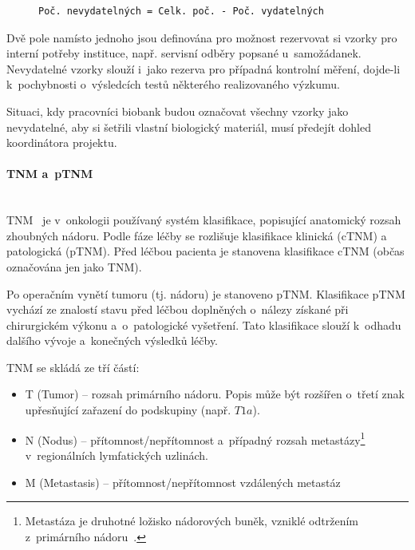 \documentclass[11pt, final, oneside]{fithesis2}
\newcommand{\paragraphNewLine}[1]{\paragraph*{#1}\mbox{}\\}
\begin{document}
\begin{figure}[ht!] %
\centering
\begin{BVerbatim}
Poč. nevydatelných = Celk. poč. - Poč. vydatelných
\end{BVerbatim}
\end{figure}
Dvě pole namísto jednoho jsou definována pro možnost rezervovat si vzorky pro interní potřeby instituce, např. servisní odběry popsané u~samožádanek. Nevydatelné vzorky slouží i~jako rezerva pro případná kontrolní měření, dojde-li k~pochybnosti o~výsledcích testů některého realizovaného výzkumu.

Situaci, kdy pracovníci biobank budou označovat všechny vzorky jako nevydatelné, aby si šetřili vlastní biologický materiál, musí předejít dohled koordinátora projektu. 

\paragraphNewLine{TNM a~pTNM}
TNM~\cite{TNM} je v~onkologii používaný systém klasifikace, popisující anatomický rozsah zhoubných nádoru. Podle fáze léčby se rozlišuje klasifikace klinická (cTNM) a patologická (pTNM). Před léčbou pacienta je stanovena klasifikace cTNM (občas označována jen jako TNM).

Po operačním vynětí tumoru (tj. nádoru) je stanoveno pTNM. Klasifikace pTNM vychází ze znalostí stavu před léčbou doplněných o~nálezy získané při chirurgickém výkonu a~o~patologické vyšetření. Tato klasifikace slouží k~odhadu dalšího vývoje a~konečných výsledků léčby. 

TNM se skládá ze tří částí:
\begin{itemize}
	\item T (Tumor) -- rozsah primárního nádoru. Popis může být rozšířen o~třetí znak upřesňující zařazení do podskupiny (např. $T1a$).
	
	\item N (Nodus) -- přítomnost/nepřítomnost a~případný rozsah metastázy\footnote{Metastáza je druhotné ložisko nádorových buněk, vzniklé odtržením z~primárního nádoru~\cite{metastaza}.} v~regionálních lymfatických uzlinách.
	\item M (Metastasis) -- přítomnost/nepřítomnost vzdálených metastáz
\end{itemize}
\end{document}
